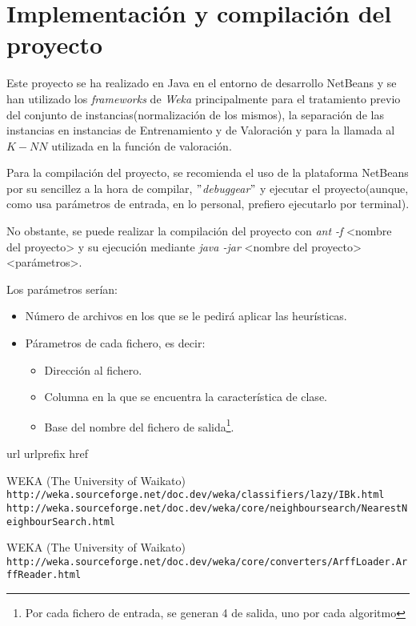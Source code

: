 \documentclass[a4paper, 11pt]{article}
\begin{document}
	\section{Implementación y compilación del proyecto}
		Este proyecto se ha realizado en Java en el entorno de desarrollo NetBeans y se han utilizado
		los \textit{frameworks} de \textit{Weka} principalmente para el tratamiento previo del
		conjunto de instancias(normalización de los mismos), la separación de las instancias en
		instancias de Entrenamiento y de Valoración y para la llamada al $K-NN$ utilizada en la
		función de valoración.
		
		Para la compilación del proyecto, se recomienda el uso de la plataforma NetBeans por su
		sencillez a la hora de compilar, \textit{$"$debuggear$"$} y ejecutar el proyecto(aunque,
		como usa parámetros de entrada, en lo personal, prefiero ejecutarlo por terminal).
		
		No obstante, se puede realizar la compilación del proyecto con \textit{ant -f} <nombre del
		proyecto> y su ejecución mediante \textit{java -jar} <nombre del proyecto> <parámetros>.
		
		Los parámetros serían:
			\begin{itemize}
				\item Número de archivos en los que se le pedirá aplicar las heurísticas.
				\item Párametros de cada fichero, es decir:
					\begin{itemize}
						\item Dirección al fichero.
						\item Columna en la que se encuentra la característica de clase.
						\item Base del nombre del fichero de salida\footnote{Por cada fichero
						de entrada, se generan 4 de salida, uno por cada algoritmo}.
					\end{itemize}
			\end{itemize}
		
	\newpage
	
	\begin{thebibliography}{10}
	\expandafter\ifx\csname url\endcsname\relax
	  \def\url#1{\texttt{#1}}\fi
	\expandafter\ifx\csname urlprefix\endcsname\relax\def\urlprefix{URL }\fi
	\expandafter\ifx\csname href\endcsname\relax
	  \def\href#1#2{#2} \def\path#1{#1}\fi
	
	WEKA (The University of Waikato)\\
	  \url{http://weka.sourceforge.net/doc.dev/weka/classifiers/lazy/IBk.html}\\
	  \url{http://weka.sourceforge.net/doc.dev/weka/core/neighboursearch/NearestNeighbourSearch.html}
	  
  	WEKA (The University of Waikato)\\
	  \url{http://weka.sourceforge.net/doc.dev/weka/core/converters/ArffLoader.ArffReader.html}
	  
	\end{thebibliography}
\end{document}

